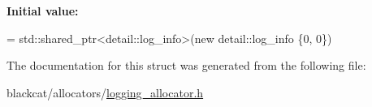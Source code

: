 {\bfseries Initial value\+:}
\begin{DoxyCode}
=
        std::shared\_ptr<detail::log\_info>(\textcolor{keyword}{new} detail::log\_info \{0, 0\})
\end{DoxyCode}


The documentation for this struct was generated from the following file\+:\begin{DoxyCompactItemize}
\item 
blackcat/allocators/\hyperlink{logging__allocator_8h}{logging\+\_\+allocator.\+h}\end{DoxyCompactItemize}
